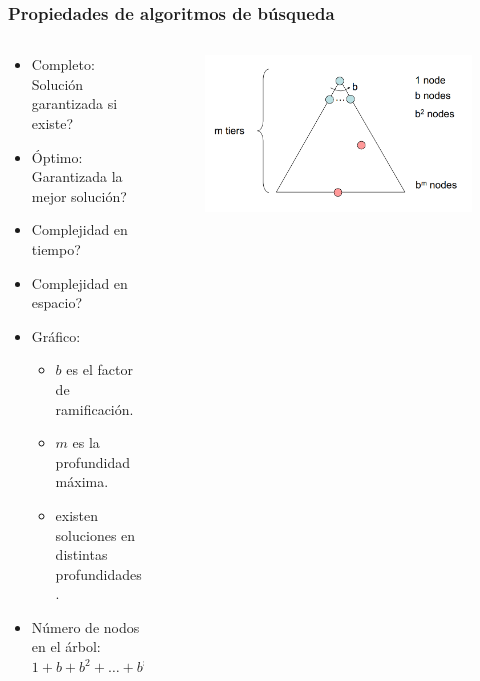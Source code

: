 \documentclass[10pt]{beamer}
\begin{document}
\begin{frame}
  \frametitle{Propiedades de algoritmos de búsqueda}
  \begin{columns}
    \begin{column}{0.5\textwidth}
      \begin{itemize}
        \item Completo: Solución garantizada si existe?
        \item Óptimo: Garantizada la mejor solución?
        \item Complejidad en tiempo?
        \item Complejidad en espacio?
        \item Gráfico:
          \begin{itemize}
            \item $b$ es el factor de ramificación.
            \item $m$ es la profundidad máxima.
            \item existen soluciones en distintas profundidades.
          \end{itemize}
        \item Número de nodos en el árbol: $1 + b + b^2 + \dots + b^m = O(b^m)$
      \end{itemize}
    \end{column}
    \begin{column}{0.5\textwidth}
      \begin{figure}[!h] 
        \centering
        \includegraphics[width=1\textwidth]{img/dfs1}
      \end{figure} 
    \end{column}
  \end{columns}
\end{frame}
\end{document}
